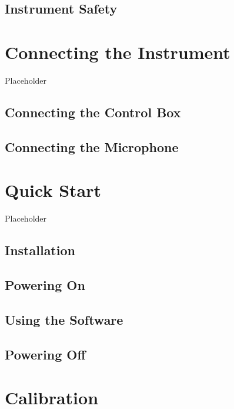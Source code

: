 \documentclass[]{book}
\begin{document}
\section{Instrument Safety}\label{instrument-safety}

\chapter{Connecting the Instrument}\label{connecting-the-instrument}

Placeholder

\section{Connecting the Control Box}\label{connecting-the-control-box}

\section{Connecting the Microphone}\label{connecting-the-microphone}

\chapter{Quick Start}\label{quick-start}

Placeholder

\section{Installation}\label{installation}

\section{Powering On}\label{powering-on}

\section{Using the Software}\label{using-the-software}

\section{Powering Off}\label{powering-off}

\chapter{Calibration}\label{calibration}
\end{document}
